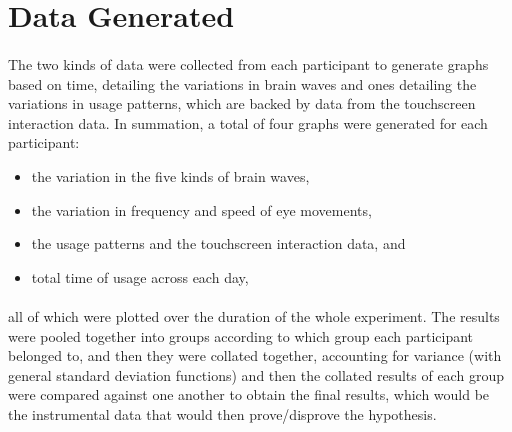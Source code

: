 \documentclass{article}
\begin{document}
\section{Data Generated}
\paragraph{}The two kinds of data were collected from each participant to generate graphs based on time, detailing the variations in brain waves and ones detailing the variations in usage patterns, which are backed by data from the touchscreen interaction data. In summation, a total of four graphs were generated for each participant:

\begin{itemize}
    \item the variation in the five kinds of brain waves,
    \item the variation in frequency and speed of eye movements,
    \item the usage patterns and the touchscreen interaction data, and
    \item total time of usage across each day,
\end{itemize}

\paragraph{}all of which were plotted over the duration of the whole experiment. The results were pooled together into groups according to which group each participant belonged to, and then they were collated together, accounting for variance (with general standard deviation functions) and then the collated results of each group were compared against one another to obtain the final results, which would be the instrumental data that would then prove/disprove the hypothesis.

\newpage
\printbibliography
\end{document}
